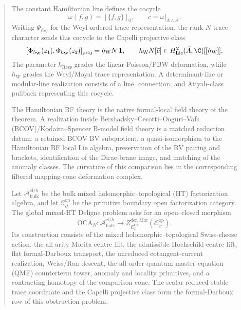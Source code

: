 \begin{abstract}
\medskip\noindent
The constant Hamiltonian line defines the cocycle
\[
  \omega(f,g)=[\{f,g\}]_0,
  \qquad
  \bar c=\omega|_{\bar A\wedge\bar A}.
\]
Writing \(\Phi_{\hbar_{\mathrm W}}\) for the Weyl-ordered trace
representation, the rank-\(N\) trace character sends this cocycle to the
Capelli projective class
\[
  [\Phi_{\hbar_{\mathrm W}}(z_1),
    \Phi_{\hbar_{\mathrm W}}(z_2)]_{\mathrm{proj}}
  =\hbar_{\mathrm W}N\,\mathbf 1,
  \qquad
  \hbar_{\mathrm W}N[\bar c]
  \in H^2_{\mathrm{Lie}}(\bar A,\C)[[\hbar_{\mathrm W}]].
\]
The parameter \(\hbar_{\mathrm{Rees}}\) grades the linear-Poisson/PBW
deformation, while \(\hbar_{\mathrm W}\) grades the Weyl/Moyal trace
representation.
A determinant-line or modular-line realization consists of a line,
connection, and Atiyah-class pullback representing this cocycle.

\medskip\noindent
The Hamiltonian BF theory is the native formal-local field theory of the
theorem.  A realization inside
Bershadsky--Cecotti--Ooguri--Vafa (BCOV)/Kodaira--Spencer B-model field
theory is a matched reduction datum: a retained BCOV BV subquotient, a
quasi-isomorphism to the Hamiltonian BF local Lie algebra, preservation of
the BV pairing and brackets, identification of the Dirac-brane image, and
matching of the anomaly classes.  The curvature of this comparison lies
in the corresponding filtered mapping-cone deformation complex.

Let \(\mathcal A^{\mathrm{cl}/\hbar}_{\mathrm{bulk}}\) be the bulk
mixed holomorphic--topological (HT) factorization algebra, and let
\(\mathcal C^{\mathrm{op}}_\partial\) be the primitive boundary open
factorization category.  The global mixed-HT Deligne problem asks for an
open--closed morphism
\[
  \mathrm{OCA}_N\colon
  \mathcal A^{\mathrm{cl}/\hbar}_{\mathrm{bulk}}
  \longrightarrow
  Z^{\mathrm{der},\mathrm{Mor}}_{E_2^{\mathrm{HT}}}
  (\mathcal C^{\mathrm{op}}_\partial).
\]
Its construction consists of the mixed holomorphic--topological
Swiss-cheese action, the all-arity Morita centre lift, the admissible
Hochschild-centre lift, flat formal-Darboux transport, the unreduced
cotangent-current realization, Weiss/Ran descent, the all-order quantum
master equation (QME) counterterm tower, anomaly and locality primitives,
and a contracting homotopy of the comparison cone.  The scalar-reduced
stable trace coordinate and the Capelli projective class form the
formal-Darboux row of this obstruction problem.

\end{abstract}
